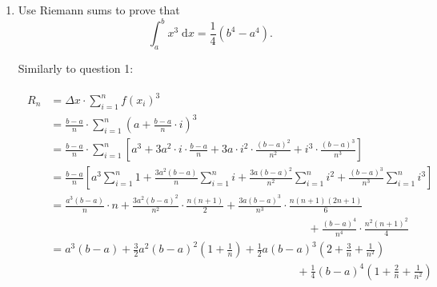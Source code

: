 \documentclass[12pt]{article}
\begin{document}
\begin{enumerate}
    \newpage

    \item Use Riemann sums to prove that $$\int_{a}^b x^3 \; \mathrm{d}x = \frac{1}{4}(b^{4}-a^{4}).$$ \par
    Similarly to question 1: \par
    \begin{align*}
    \begin{split}
    R_n &=\Delta x\cdot\sum_{i=1}^{n}f\left(x_i\right)^3\\
    &=\frac{b-a}{n}\cdot\sum_{i=1}^{n}\left(a +\frac{b-a}{n}\cdot i \right)^3\\
    &=\frac{b-a}{n}\cdot\sum_{i=1}^{n} \left[a^3+ 3a^2\cdot i\cdot\frac{b-a}{n}+ 3a\cdot i^2\cdot\frac{\left(b-a\right)^2}{n^2} + i^3\cdot\frac{\left(b-a\right)^3}{n^3}\right]\\
    &=\frac{b-a}{n}\left[ a^3\sum_{i=1}^{n}1 
    + \frac{3a^2\left(b-a\right)}{n} \sum_{i=1}^{n}i
    + \frac{3a\left(b-a\right)^2}{n^2} \sum_{i=1}^{n}i^2
    + \frac{\left(b-a\right)^3}{n^3} \sum_{i=1}^{n}i^3 \right]\\
    &=\frac{a^3\left(b-a\right)}{n}\cdot n
    + \frac{3a^2\left(b-a\right)^2}{n^2} \cdot\frac{n\left(n+1\right)}{2}
    + \frac{3a\left(b-a\right)^3}{n^3} \cdot\frac{n\left(n+1\right)\left(2n+1\right)}{6}\\
    &\qquad\qquad\qquad\qquad\qquad\qquad\qquad\qquad\qquad\qquad
    \qquad\quad
    + \frac{\left(b-a\right)^4}{n^4} \cdot \frac{n^2\left(n+1 \right)^2}{4}\\
    &=a^3\left(b-a\right)
    + \frac{3}{2} a^2\left(b-a\right)^2 \left(1+\frac{1}{n}\right)
    + \frac{1}{2} a\left(b-a\right)^3 \left(2+ \frac{3}{n}+ \frac{1}{n^2} \right) \\
    &\qquad\qquad\qquad\qquad\qquad\qquad\qquad\qquad
    \qquad\qquad\qquad
    + \frac{1}{4} \left(b-a\right)^4 \left(1+ \frac{2}{n}+ \frac{1}{n^2} \right)
    \end{split}
    \end{align*}


\end{enumerate}
\end{document}
